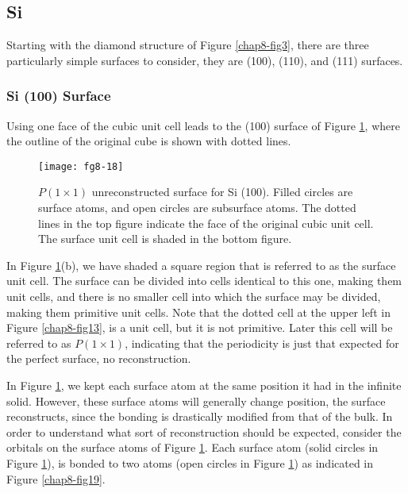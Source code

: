\subsection{Si}

Starting with the diamond structure of Figure \ref{chap8-fig3}, there
are three particularly simple surfaces to consider, they are (100),
(110), and (111) surfaces.

\subsubsection{Si (100) Surface}

Using one face of the cubic unit cell leads to the (100) surface of Figure 
\ref{chap8-fig18}, where the outline of the original cube is shown
with dotted lines. 

\begin{figure}
\begin{center}
\texttt{[image: fg8-18]}
\end{center}
\caption{$P(1 \times 1)$ unreconstructed surface for Si (100).  Filled
circles are surface atoms, and open circles are subsurface atoms.  The
dotted lines in the top figure indicate the face of the original cubic
unit cell. The surface unit cell is shaded in the bottom figure.}
\label{chap8-fig18}
\end{figure}

In Figure \ref{chap8-fig18}(b), we have shaded a square region that is
referred to as the surface unit cell.  The surface can be divided into
cells identical to this one, making them unit cells, and there is no
smaller cell into which the surface may be divided, making them
primitive unit cells.  Note that the dotted cell at the upper left in
Figure \ref{chap8-fig13}, is a unit cell, but it is not primitive.
Later this cell will be referred to as $P(1 \times 1)$, indicating
that the periodicity is just that expected for the perfect surface, no
reconstruction.

In Figure \ref{chap8-fig18}, we kept each surface atom at the same
position it had in the infinite solid.  However, these surface atoms
will generally change position, the surface reconstructs, since the
bonding is drastically modified from that of the bulk. In order to
understand what sort of reconstruction should be expected, consider
the orbitals on the surface atoms of Figure \ref{chap8-fig18}.  Each
surface atom (solid circles in Figure \ref{chap8-fig18}), is bonded to
two atoms (open circles in Figure \ref{chap8-fig18}) as indicated in
Figure \ref{chap8-fig19}.

